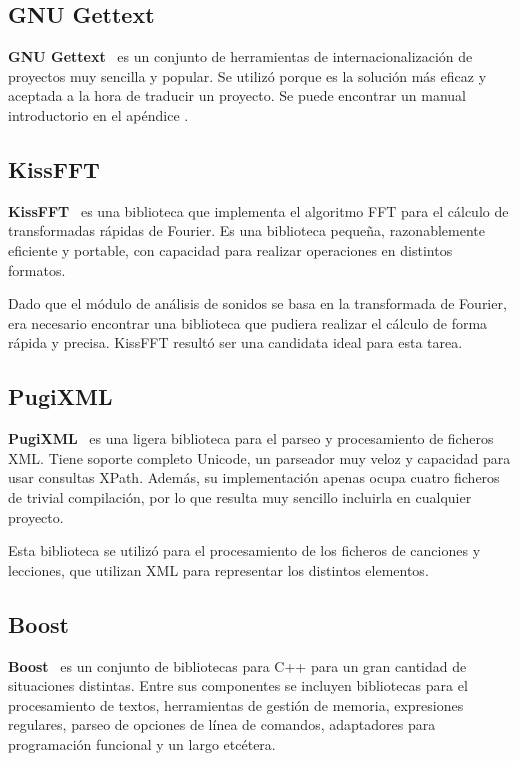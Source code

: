 \subsection{GNU Gettext}

\textbf{GNU Gettext}~\cite{refgettext} es un conjunto de herramientas de internacionalización de
proyectos muy sencilla y popular. Se utilizó porque es la solución más eficaz y
aceptada a la hora de traducir un proyecto. Se puede encontrar un manual
introductorio en el apéndice \textit{}.

\subsection{KissFFT}
\textbf{KissFFT}~\cite{kissfft} es una biblioteca que implementa el algoritmo
FFT para el cálculo de transformadas rápidas de Fourier. Es una biblioteca
pequeña, razonablemente eficiente y portable, con capacidad para realizar
operaciones en distintos formatos.

Dado que el módulo de análisis de sonidos se basa en la transformada de Fourier,
era necesario encontrar una biblioteca que pudiera realizar el cálculo de forma
rápida y precisa. KissFFT resultó ser una candidata ideal para esta tarea.

\subsection{PugiXML}
\textbf{PugiXML}~\cite{pugixml} es una ligera biblioteca para el parseo y
procesamiento de ficheros XML. Tiene soporte completo Unicode, un parseador muy
veloz y capacidad para usar consultas XPath. Además, su implementación apenas
ocupa cuatro ficheros de trivial compilación, por lo que resulta muy sencillo
incluirla en cualquier proyecto.

Esta biblioteca se utilizó para el procesamiento de los ficheros de canciones y
lecciones, que utilizan XML para representar los distintos elementos.

\subsection{Boost}
\textbf{Boost}~\cite{boost} es un conjunto de bibliotecas para C++ para un gran
cantidad de situaciones distintas. Entre sus componentes se incluyen bibliotecas
para el procesamiento de textos, herramientas de gestión de memoria, expresiones
regulares, parseo de opciones de línea de comandos, adaptadores para
programación funcional y un largo etcétera.

